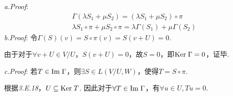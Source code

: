 \textit{a.Proof}:
    \begin{align*}
        &\Gamma(\lambda S_1+\mu S_2)=(\lambda S_1+\mu S_2) \circ \pi \\
        &\lambda S_1 \circ \pi+\mu S_2 \circ \pi=\lambda \Gamma(S_1)+\mu \Gamma(S_2)
    \end{align*}
\textit{b.Proof}:
令$\Gamma(S)(v)=S \circ \pi(v)=S(v+U)=0$.

由于对于$\forall v+U \in V/U$，$S(v+U)=0$，故$S=0$，即$\mathrm{Ker \;}  \Gamma=0$，证毕.

\textit{c.Proof}:
若$T \in \mathrm{Im \;}  \Gamma$，则$\exists S \in L(V/U,W)$，使得$T=S \circ \pi$.

根据\textit{3.E.18}，$U \subseteq \mathrm{Ker \;} T$.
因此对于$\forall T \in \mathrm{Im \;} \Gamma$，有$\forall u \in U,Tu=0$.

